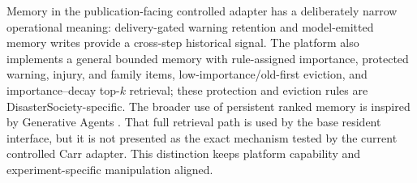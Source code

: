 \documentclass[journal]{IEEEtran}
\begin{document}
Memory in the publication-facing controlled adapter has a deliberately narrow
operational meaning: delivery-gated warning retention and model-emitted memory
writes provide a cross-step historical signal. The platform also implements a
general bounded memory with rule-assigned importance, protected warning,
injury, and family items, low-importance/old-first eviction, and
importance--decay top-$k$ retrieval; these protection and eviction rules are
DisasterSociety-specific. The broader use of persistent ranked memory is
inspired by Generative Agents \cite{park2023generativeagents}. That full
retrieval path is used by the
base resident interface, but it is not presented as the exact mechanism tested
by the current controlled Carr adapter. This distinction keeps platform
capability and experiment-specific manipulation aligned.
\end{document}
